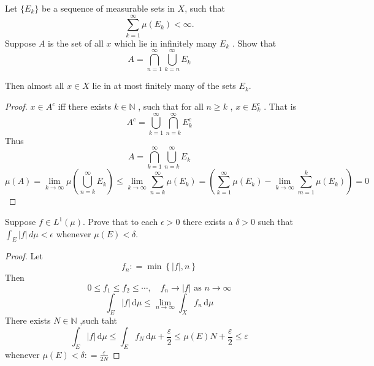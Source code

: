 \documentclass[../main.tex]{subfiles}
\begin{document}
\begin{problem}{}{}
    Let $\{E_k\}$ be a sequence of measurable sets in $X$, such that
\[
\sum_{k=1}^{\infty} \mu(E_k) < \infty.
\]
Suppose \(  A  \)  is the set of all \(  x  \)  which lie in infinitely many \(  E_{k}  \) . Show that
\[ A = \bigcap_{n=1}^\infty \bigcup_{k=n}^\infty E_k \]

Then almost all $x \in X$ lie in at most finitely many of the sets $E_k$.
\end{problem}
\begin{proof}
    \(  x \in A^{c}   \) iff there exists \(  k \in \mathbb{N}   \) , such that for all \(  n\ge k  \) ,  \(  x\in E_{k}^{c}  \)   . That is \[
    A^{c}= \bigcup _{k = 1}^{\infty} \bigcap_{ n = k}^{\infty} E_{k}^{c} 
    \]Thus \[
    A=  \bigcap_{k=1 }^{\infty} \bigcup _{n = k}^{\infty}E_{k} 
    \] \[
    \mu \left( A \right)= \lim_{k\to \infty} \mu \left( \bigcup _{n = k}^{\infty}E_{k} \right) \le \lim_{k\to \infty} \sum _{n = k}^{\infty} \mu \left( E_{k} \right) =  \left( \sum _{k= 1}^{\infty}\mu \left( E_{k} \right)-\lim_{k\to \infty}\sum _{m = 1}^{k}\mu \left( E_{k} \right)   \right)= 0 
    \]
\end{proof}
\begin{problem}{}{}
Suppose $f \in L^1(\mu)$. Prove that to each $\epsilon > 0$ there exists a $\delta > 0$ such that $\int_E |f| \,d\mu < \epsilon$ whenever $\mu(E) < \delta$.
\end{problem}
\begin{proof}
   Let \[
   f_{n}: =  \min \left\{ \left| f \right|,n  \right\}
   \] Then \[
   0\le f_1\le f_2\le \cdots ,\quad  f_{n}\to  \left| f \right| \text{ as } n\to \infty
   \] \[
   \int_{E}\left| f \right|\,\mathrm{d} \mu  \le \lim_{n\to \infty} \int_{X} f_{n}\,\mathrm{d} \mu  
   \] There exists  \(  N \in \mathbb{N}   \) ,such taht \[
   \int_{E}\left| f \right|\,\mathrm{d} \mu \le \int_{E} f_{N}\,\mathrm{d} \mu + \frac{ \varepsilon  }{2 }\le \mu \left( E \right)N+ \frac{ \varepsilon  }{2 } \le  \varepsilon    
   \] whenever \(  \mu \left( E \right)<  \delta : = \frac{ \varepsilon  }{2N }    \)  
\end{proof}
\end{document}
